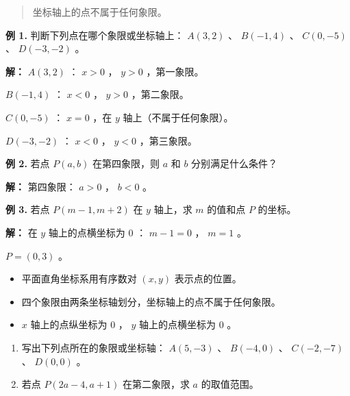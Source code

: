 \begin{quote}
坐标轴上的点不属于任何象限。
\end{quote}


\begin{workedexamples}


\textbf{例 1.} 判断下列点在哪个象限或坐标轴上： $A(3, 2)$ 、 $B(-1, 4)$ 、 $C(0, -5)$ 、 $D(-3, -2)$ 。

\textbf{解：}
$A(3, 2)$ ： $x > 0$ ， $y > 0$ ，第一象限。

$B(-1, 4)$ ： $x < 0$ ， $y > 0$ ，第二象限。

$C(0, -5)$ ： $x = 0$ ，在 $y$ 轴上（不属于任何象限）。

$D(-3, -2)$ ： $x < 0$ ， $y < 0$ ，第三象限。

\textbf{例 2.} 若点 $P(a, b)$ 在第四象限，则 $a$ 和 $b$ 分别满足什么条件？

\textbf{解：}
第四象限： $a > 0$ ， $b < 0$ 。

\textbf{例 3.} 若点 $P(m-1, m+2)$ 在 $y$ 轴上，求 $m$ 的值和点 $P$ 的坐标。

\textbf{解：}
在 $y$ 轴上的点横坐标为 $0$ ： $m - 1 = 0$ ， $m = 1$ 。

$P = (0, 3)$ 。

\end{workedexamples}

\begin{keytakeaway}


\begin{itemize}
  \item 平面直角坐标系用有序数对 $(x, y)$ 表示点的位置。
  \item 四个象限由两条坐标轴划分，坐标轴上的点不属于任何象限。
  \item $x$ 轴上的点纵坐标为 $0$ ， $y$ 轴上的点横坐标为 $0$ 。
\end{itemize}


\end{keytakeaway}

\begin{practice}


\begin{enumerate}
  \item 写出下列点所在的象限或坐标轴： $A(5, -3)$ 、 $B(-4, 0)$ 、 $C(-2, -7)$ 、 $D(0, 0)$ 。
  \item 若点 $P(2a-4, a+1)$ 在第二象限，求 $a$ 的取值范围。
\end{enumerate}


\end{practice}



